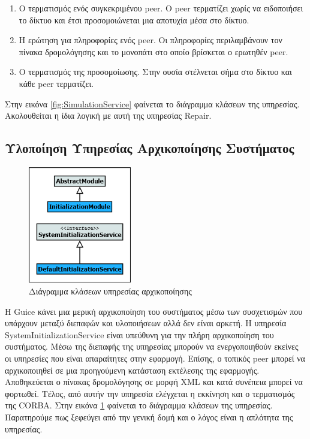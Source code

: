 \begin{enumerate}
\item Ο τερματισμός ενός συγκεκριμένου peer. Ο peer τερματίζει χωρίς να 
ειδοποιήσει το δίκτυο και έτσι προσομοιώνεται μια αποτυχία μέσα στο 
δίκτυο.
\item Η ερώτηση για πληροφορίες ενός peer. Οι πληροφορίες περιλαμβάνουν 
τον πίνακα δρομολόγησης και το μονοπάτι στο οποίο βρίσκεται ο ερωτηθέν 
peer.
\item Ο τερματισμός της προσομοίωσης. Στην ουσία στέλνεται σήμα στο 
δίκτυο και κάθε peer τερματίζει.
\setcounter{numberedCntBB}{\theenumi}
\end{enumerate}
Στην εικόνα \ref{fig:SimulationService} φαίνεται το διάγραμμα κλάσεων 
της υπηρεσίας. Ακολουθείται η ίδια λογική με αυτή της υπηρεσίας Repair.

\subsection{Υλοποίηση Υπηρεσίας Αρχικοποίησης Συστήματος}

\begin{figure}
  \begin{center}
    \includegraphics[width=0.40\textwidth]{Figures/Architecture/Service_Layer/InitializationService_ClassDiagram.png}
  \end{center}
  \caption{Διάγραμμα κλάσεων υπηρεσίας αρχικοποίησης}
  \label{fig:InitService}
\end{figure}

Η Guice κάνει μια μερική αρχικοποίηση του συστήματος μέσω των 
συσχετισμών που υπάρχουν μεταξύ διεπαφών και υλοποιήσεων αλλά δεν είναι 
αρκετή. Η υπηρεσία SystemInitializationService είναι υπεύθυνη για την 
πλήρη αρχικοποίηση του συστήματος. Μέσω της διεπαφής της υπηρεσίας 
μπορούν να ενεργοποιηθούν εκείνες οι υπηρεσίες που είναι απαραίτητες 
στην εφαρμογή. Επίσης, ο τοπικός peer μπορεί να αρχικοποιηθεί σε μια 
προηγούμενη κατάσταση εκτέλεσης της εφαρμογής. Αποθηκεύεται ο πίνακας 
δρομολόγησης σε μορφή XML και κατά συνέπεια μπορεί να φορτωθεί. Τέλος, 
από αυτήν την υπηρεσία ελέγχεται η εκκίνηση και ο τερματισμός της CORBA. 
Στην εικόνα \ref{fig:InitService} φαίνεται το διάγραμμα κλάσεων της υπηρεσίας. 
Παρατηρούμε πως ξεφεύγει από την γενική δομή και ο λόγος είναι η απλότητα 
της υπηρεσίας.

